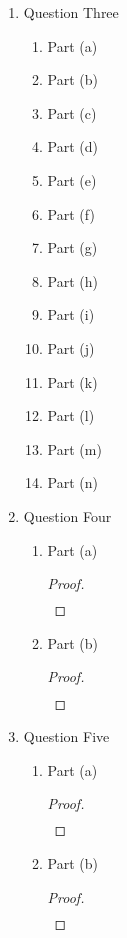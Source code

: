 \documentclass{article}
\begin{document}
\begin{enumerate}
\begin{enumerate}
    \end{enumerate}
    \item Question Three
    \begin{enumerate}
        \item Part (a)
        \item Part (b)
        \item Part (c)
        \item Part (d)
        \item Part (e)
        \item Part (f)
        \item Part (g)
        \item Part (h)
        \item Part (i)
        \item Part (j)
        \item Part (k)
        \item Part (l)
        \item Part (m)
        \item Part (n)
    \end{enumerate}
    \item Question Four
    \begin{enumerate}
        \item Part (a)
        \begin{proof}
            \begin{align}
                &
            \end{align}
        \end{proof}
        \item Part (b)
        \begin{proof}
            \begin{align}
                &
            \end{align}
        \end{proof}
    \end{enumerate}
    \item Question Five
    \begin{enumerate}
        \item Part (a)
        \begin{proof}
            \begin{align}
                &
            \end{align}
        \end{proof}
        \item Part (b)
        \begin{proof}
            \begin{align}

\end{align}
\end{proof}
\end{enumerate}
\end{enumerate}
\end{document}
